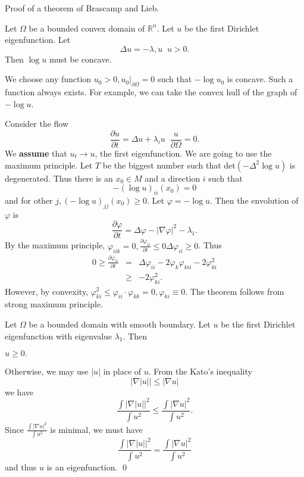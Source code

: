 
Proof of a theorem of Brascamp and Lieb.

\begin{theorem} Let $ \Omega $ be a bounded convex domain of $ \mathbb{R}^n$. Let $u$ be the first Dirichlet eigenfunction. Let 
%
\[ \Delta u = - \lambda , u  \;\; u > 0 .\]
%
Then $ \log u$ must be concave.

\end{theorem}
 We choose any function $ u_0 > 0 , u _0 |_{\partial \Omega} = 0 $ such that $ - 
\log u_0 $ is concave. Such a function always exists. For example, we can take the convex hull of the graph of $ - \log u$.

Consider the flow
%
\[ \frac{\partial u}{\partial t}  = \Delta u + \lambda _i u \;\; \frac{u}{\partial \Omega} = 0 .\]
%
We {\bf assume} that $ u_t \rightarrow u$, the first eigenfunction. We are going to use the maximum principle. Let $T$ be the biggest number such that det$(- \Delta ^2 \log u)$ is degenerated. Thus there is an $ x_0 \in M $ and a direction $i$ such that 
%
\[ - ( \log u) _{ii} (x_0) = 0 \]
%
and for other $j, (- \log u) _{jj} (x_0) \geq 0 $. Let $ \varphi = - \log u $. Then the envolution of $ \varphi$ is 
%
\[ \frac{\partial \varphi}{\partial t}  = \Delta \varphi - |\nabla \varphi |^2 - \lambda _1 . \]
By the maximum principle, $ \varphi_{iik}  = 0 , \frac{\partial \varphi_{ii}}{\partial t} \leq 0 \Delta \varphi _{ii} \geq 0 $. Thus
%
\begin{eqnarray*} 0 \geq \frac{\partial \varphi_{ii}}{\partial t} & = &\Delta \varphi_{ii} -2  \varphi _k \varphi_{kii} - 2 \varphi ^2_{ki} \\
& \geq & - 2 \varphi_{ki}^2.\end{eqnarray*}
%
However, by convexity, $ \varphi_{ki}^2 \leq \varphi_{ii} \cdot \varphi_{kk}=0, \varphi_{ki}  \equiv 0 $. 
%
The theorem follows from strong maximum principle.

Let $ \Omega $ be a bounded domain with smooth boundary. Let $ u$ be the first Dirichlet eigenfunction with eigenvalue $ \lambda _1$. Then

\begin{lemma} $ u \geq 0. $ 
\end{lemma}

 Otherwise, we may use $ |u| $ in place of $u$. From the Kato's inequality
%
\[|\nabla |u|| \leq |\nabla u| \]
%
we have 
\[ \frac{\int |\nabla |u| |^2}{\int u^2} \leq \frac{\int |\nabla u|^2}{\int u^2}. \]
%
Since $\frac{\int |\nabla u|^2}{\int u^2} $ is minimal, we must have 
\[ \frac{\int |\nabla |u| |^2}{\int u^2} = \frac{\int |\nabla u|^2}{\int u^2} \]
%
and thus $u$ is an eigenfunction.
\qed

